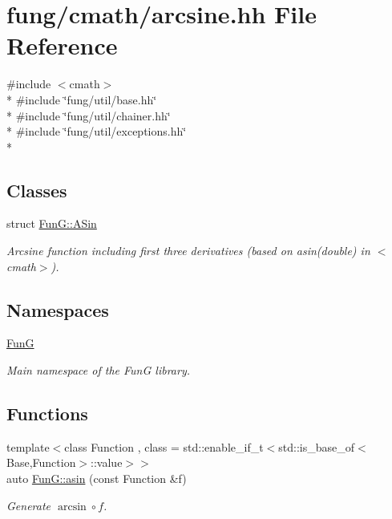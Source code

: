 \hypertarget{arcsine_8hh}{}\section{fung/cmath/arcsine.hh File Reference}
\label{arcsine_8hh}
{\ttfamily \#include $<$cmath$>$}\\*
{\ttfamily \#include \char`\"{}fung/util/base.\+hh\char`\"{}}\\*
{\ttfamily \#include \char`\"{}fung/util/chainer.\+hh\char`\"{}}\\*
{\ttfamily \#include \char`\"{}fung/util/exceptions.\+hh\char`\"{}}\\*
\subsection*{Classes}
\begin{DoxyCompactItemize}
\item 
struct \hyperlink{structFunG_1_1ASin}{Fun\+G\+::\+A\+Sin}
\begin{DoxyCompactList}\small\item\em Arcsine function including first three derivatives (based on asin(double) in $<$cmath$>$). \end{DoxyCompactList}\end{DoxyCompactItemize}
\subsection*{Namespaces}
\begin{DoxyCompactItemize}
\item 
 \hyperlink{namespaceFunG}{Fun\+G}
\begin{DoxyCompactList}\small\item\em Main namespace of the Fun\+G library. \end{DoxyCompactList}\end{DoxyCompactItemize}
\subsection*{Functions}
\begin{DoxyCompactItemize}
\item 
{\footnotesize template$<$class Function , class  = std\+::enable\+\_\+if\+\_\+t$<$std\+::is\+\_\+base\+\_\+of$<$\+Base,\+Function$>$\+::value$>$$>$ }\\auto \hyperlink{group__CMathGroup_gad26443b289325876cffdaadfca770d51}{Fun\+G\+::asin} (const Function \&f)
\begin{DoxyCompactList}\small\item\em Generate $ \arcsin\circ f $. \end{DoxyCompactList}\end{DoxyCompactItemize}
